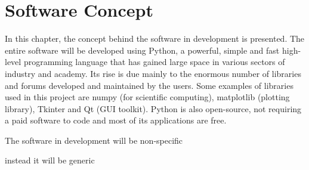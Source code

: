 \chapter{Software Concept}

\label{ch: software}

In this chapter, the concept behind the software in development is presented. The entire software will be developed using Python, a powerful, simple and fast high-level programming language that has gained large space in various sectors of industry and academy. Its rise is due mainly to the enormous number of libraries and forums developed and maintained by the users. Some examples of libraries used in this project are numpy (for scientific computing), matplotlib (plotting library), Tkinter and Qt (GUI toolkit). Python is also open-source, not requiring a paid software to code and most of its applications are free.

The software in development will be non-specific 

instead it will be generic